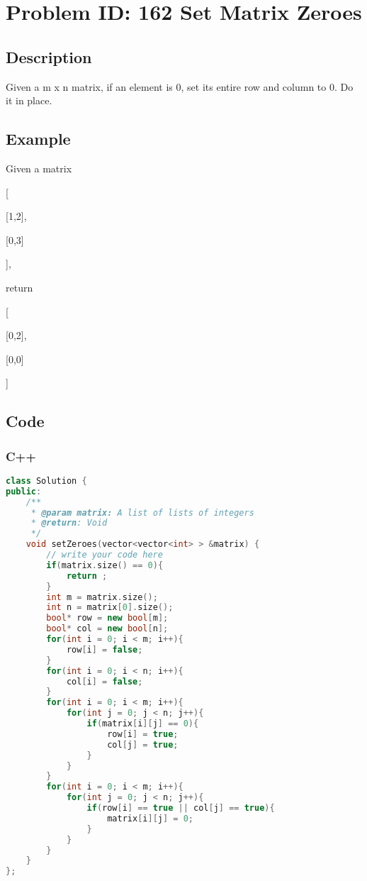 \section{Problem ID: 162 Set Matrix Zeroes}
\subsection{Description}
Given a m x n matrix, if an element is 0, set its entire row and column to 0. Do it in place.

\subsection{Example}
Given a matrix

[

  [1,2],
  
  [0,3]
  
],

return

[

[0,2],

[0,0]

]

\subsection{Code}
\scriptsize
\subsubsection{C++}
\begin{lstlisting}[language=C++]
class Solution {
public:
    /**
     * @param matrix: A list of lists of integers
     * @return: Void
     */
    void setZeroes(vector<vector<int> > &matrix) {
        // write your code here
        if(matrix.size() == 0){
            return ;
        }
        int m = matrix.size();
        int n = matrix[0].size();
        bool* row = new bool[m];
        bool* col = new bool[n];
        for(int i = 0; i < m; i++){
            row[i] = false;
        }
        for(int i = 0; i < n; i++){
            col[i] = false;
        }
        for(int i = 0; i < m; i++){
            for(int j = 0; j < n; j++){
                if(matrix[i][j] == 0){
                    row[i] = true;
                    col[j] = true;
                }
            }
        }
        for(int i = 0; i < m; i++){
            for(int j = 0; j < n; j++){
                if(row[i] == true || col[j] == true){
                    matrix[i][j] = 0;
                }
            }
        }
    }
};
\end{lstlisting}


